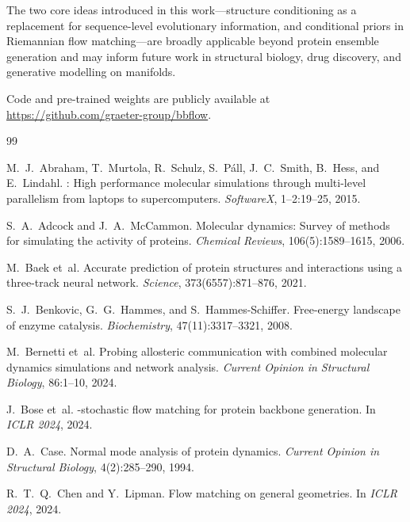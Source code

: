\documentclass[12pt,a4paper]{article}
\begin{document}
The two core ideas introduced in this work---structure conditioning as a replacement for
sequence-level evolutionary information, and conditional priors in Riemannian flow matching---are
broadly applicable beyond protein ensemble generation and may inform future work in
structural biology, drug discovery, and generative modelling on manifolds.

Code and pre-trained weights are publicly available at
\url{https://github.com/graeter-group/bbflow}.

\begin{thebibliography}{99}

M.\ J.\ Abraham, T.\ Murtola, R.\ Schulz, S.\ P\'{a}ll, J.\ C.\ Smith, B.\ Hess, and E.\ Lindahl.
: High performance molecular simulations through multi-level parallelism from laptops to supercomputers.
\newblock \emph{SoftwareX}, 1--2:19--25, 2015.

S.\ A.\ Adcock and J.\ A.\ McCammon.
\newblock Molecular dynamics: Survey of methods for simulating the activity of proteins.
\newblock \emph{Chemical Reviews}, 106(5):1589--1615, 2006.

M.\ Baek et~al.
\newblock Accurate prediction of protein structures and interactions using a three-track neural network.
\newblock \emph{Science}, 373(6557):871--876, 2021.

S.\ J.\ Benkovic, G.\ G.\ Hammes, and S.\ Hammes-Schiffer.
\newblock Free-energy landscape of enzyme catalysis.
\newblock \emph{Biochemistry}, 47(11):3317--3321, 2008.

M.\ Bernetti et~al.
\newblock Probing allosteric communication with combined molecular dynamics simulations and network analysis.
\newblock \emph{Current Opinion in Structural Biology}, 86:1--10, 2024.

J.\ Bose et~al.
-stochastic flow matching for protein backbone generation.
\newblock In \emph{ICLR 2024}, 2024.

D.\ A.\ Case.
\newblock Normal mode analysis of protein dynamics.
\newblock \emph{Current Opinion in Structural Biology}, 4(2):285--290, 1994.

R.\ T.\ Q.\ Chen and Y.\ Lipman.
\newblock Flow matching on general geometries.
\newblock In \emph{ICLR 2024}, 2024.


\end{thebibliography}
\end{document}

